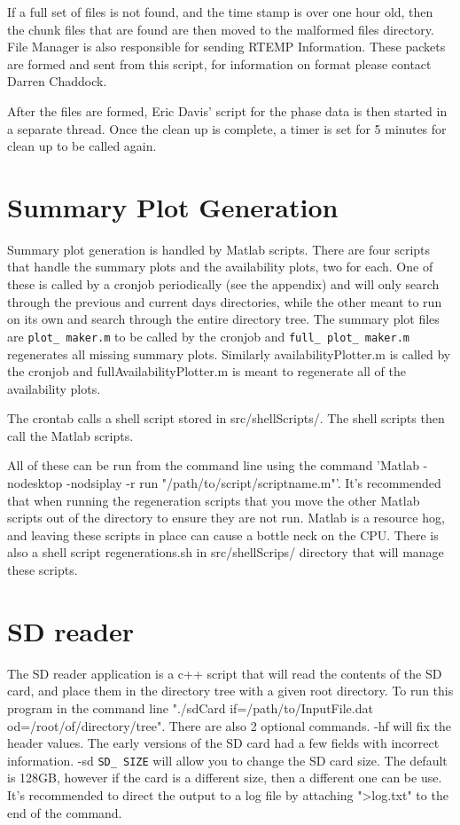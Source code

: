 \documentclass{article}
\begin{document}
If a full set of files is not found, and the time stamp is over one hour old, then the chunk files that are found are then moved to the malformed files directory. File Manager is also responsible for sending RTEMP Information. These packets are formed and sent from this script, for information on format please contact Darren Chaddock.

After the files are formed, Eric Davis' script for the phase data is then started in a separate thread. Once the clean up is complete, a timer is set for 5 minutes for clean up to be called again.


\section{Summary Plot Generation}

Summary plot generation is handled by Matlab scripts. There are four scripts that handle the summary plots and the availability plots, two for each. One of these is called by a cronjob periodically (see the appendix) and will only search through the previous and current days directories, while the other meant to run on its own and search through the entire directory tree. The summary plot files are \texttt{plot\_ maker.m} to be called by the cronjob and \texttt{full\_ plot\_ maker.m} regenerates all missing summary plots. Similarly availabilityPlotter.m is called by the cronjob and fullAvailabilityPlotter.m is meant to regenerate all of the availability plots.  

The crontab calls a shell script stored in src/shellScripts/. The shell scripts then call the Matlab scripts. 

All of these can be run from the command line using the command 'Matlab -nodesktop -nodsiplay -r run "/path/to/script/scriptname.m"'. It's recommended that when running the regeneration scripts that you move the other Matlab scripts out of the directory to ensure they are not run. Matlab is a resource hog, and leaving these scripts in place can cause a bottle neck on the CPU. There is also a shell script regenerations.sh in src/shellScrips/ directory that will manage these scripts. 

\section{SD reader}

The SD reader application is a c++ script that will read the contents of the SD card, and place them in the directory tree with a given root directory. To run this program in the command line "./sdCard if=/path/to/InputFile.dat od=/root/of/directory/tree". There are also 2 optional commands. -hf will fix the header values. The early versions of the SD card had a few fields with incorrect information. -sd \texttt{SD\_ SIZE} will allow you to change the SD card size. The default is 128GB, however if the card is a different size, then a different one can be use. It's recommended to direct the output to a log file by attaching ">log.txt" to the end of the command. 
\end{document}
